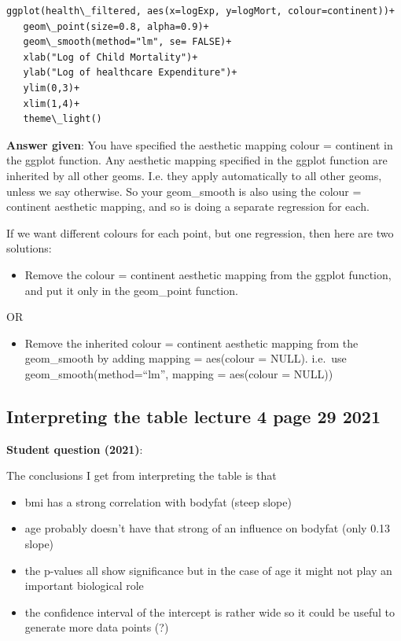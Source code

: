 \documentclass[
  letterpaper,
  8pt,
  a4paper]{book}
\providecommand{\tightlist}{%
  \setlength{\itemsep}{0pt}\setlength{\parskip}{0pt}}
\begin{document}
\begin{verbatim}
ggplot(health\_filtered, aes(x=logExp, y=logMort, colour=continent))+
   geom\_point(size=0.8, alpha=0.9)+
   geom\_smooth(method="lm", se= FALSE)+
   xlab("Log of Child Mortality")+
   ylab("Log of healthcare Expenditure")+
   ylim(0,3)+
   xlim(1,4)+
   theme\_light()
\end{verbatim}

\textbf{Answer given}: You have specified the aesthetic mapping colour =
continent in the ggplot function. Any aesthetic mapping specified in the
ggplot function are inherited by all other geoms. I.e. they apply
automatically to all other geoms, unless we say otherwise. So your
geom\_smooth is also using the colour = continent aesthetic mapping, and
so is doing a separate regression for each.

If we want different colours for each point, but one regression, then
here are two solutions:

\begin{itemize}
\tightlist
\item
  Remove the colour = continent aesthetic mapping from the ggplot
  function, and put it only in the geom\_point function.
\end{itemize}

OR

\begin{itemize}
\tightlist
\item
  Remove the inherited colour = continent aesthetic mapping from the
  geom\_smooth by adding mapping = aes(colour = NULL). i.e.~use
  geom\_smooth(method=``lm'', mapping = aes(colour = NULL))
\end{itemize}

\subsection*{Interpreting the table lecture 4 page 29
2021}\label{interpreting-the-table-lecture-4-page-29-2021}

\textbf{Student question (2021)}:

The conclusions I get from interpreting the table is that

\begin{itemize}
\tightlist
\item
  bmi has a strong correlation with bodyfat (steep slope)
\item
  age probably doesn't have that strong of an influence on bodyfat (only
  0.13 slope)
\item
  the p-values all show significance but in the case of age it might not
  play an important biological role
\item
  the confidence interval of the intercept is rather wide so it could be
  useful to generate more data points (?)
\end{itemize}
\end{document}
